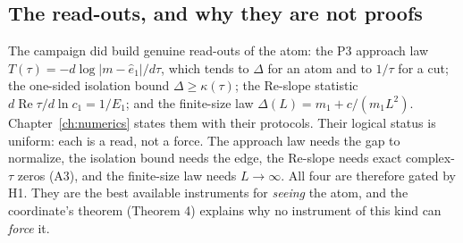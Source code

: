 \subsection{The read-outs, and why they are not proofs}

The campaign did build genuine read-outs of the atom: the P3 approach law
$T(\tau)=-d\log|m-\hat e_1|/d\tau$, which tends to $\Delta$ for an atom and to $1/\tau$ for a cut;
the one-sided isolation bound $\Delta\ge\kappa(\tau)$; the Re-slope statistic
$d\operatorname{Re}\tau/d\ln c_1=1/E_1$; and the finite-size law
$\Delta(L)=m_1+c/(m_1L^2)$. Chapter~\ref{ch:numerics} states them with their protocols. Their
logical status is uniform: each is a read, not a force. The approach law needs the gap to
normalize, the isolation bound needs the edge, the Re-slope needs exact complex-$\tau$ zeros
(A3), and the finite-size law needs $L\to\infty$. All four are therefore gated by H1. They are
the best available instruments for \emph{seeing} the atom, and the coordinate's theorem
(Theorem 4) explains why no instrument of this kind can \emph{force} it.
